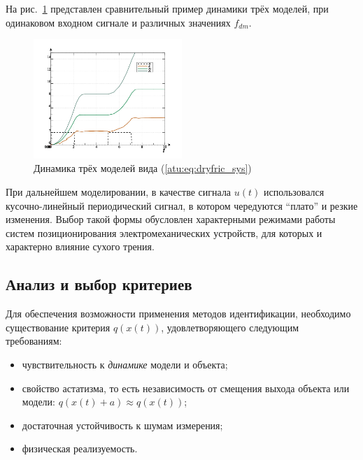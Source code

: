 На рис.~\ref{atu:f:fric_outs} представлен сравнительный пример динамики трёх
моделей, при одинаковом входном сигнале
и различных значениях $f_{dm}$.

\begin{figure}[htb!]
  \centerline{
    \includegraphics[width=0.5\textwidth]{p/cha/fric/fric_outs.png}
  }
  \caption{Динамика трёх моделей вида (\ref{atu:eq:dryfric_sys})}
  \label{atu:f:fric_outs}
\end{figure}

При дальнейшем моделировании, в качестве сигнала $u(t)$ использовался кусочно-линейный периодический сигнал,
в котором чередуются ``плато'' и резкие изменения. Выбор такой формы обусловлен
характерными режимами работы систем позиционирования электромеханических
устройств, для которых и характерно влияние сухого трения.


\subsection{Анализ и выбор критериев}  %

Для обеспечения возможности применения методов идентификации,
необходимо существование критерия
\( q(x(t)) \),
удовлетворяющего следующим требованиям:

\begin{itemize}

\item
чувствительность к \textit{динамике} модели и объекта;

\item
свойство астатизма, то есть
независимость
от смещения выхода объекта или модели:
\( q(x(t)+a ) \approx q( x(t) ) \);

\item
достаточная устойчивость к шумам измерения;

\item
физическая реализуемость.

\end{itemize}


